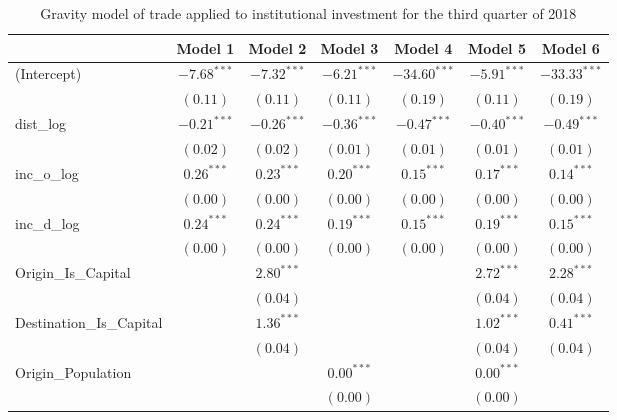 \begin{table}
	\begin{center}
		\caption[CGravity Model of Trade for Q3 2018]{Gravity model of trade applied to institutional investment for the third quarter of 2018}
		\begin{tabular}{l c c c c c c }
			\hline
			& Model 1 & Model 2 & Model 3 & Model 4 & Model 5 & Model 6 \\
			\hline
			(Intercept)                  & $-7.68^{***}$ & $-7.32^{***}$ & $-6.21^{***}$ & $-34.60^{***}$ & $-5.91^{***}$ & $-33.33^{***}$ \\
			& $(0.11)$      & $(0.11)$      & $(0.11)$      & $(0.19)$       & $(0.11)$      & $(0.19)$       \\
			dist\_log                    & $-0.21^{***}$ & $-0.26^{***}$ & $-0.36^{***}$ & $-0.47^{***}$  & $-0.40^{***}$ & $-0.49^{***}$  \\
			& $(0.02)$      & $(0.02)$      & $(0.01)$      & $(0.01)$       & $(0.01)$      & $(0.01)$       \\
			inc\_o\_log                  & $0.26^{***}$  & $0.23^{***}$  & $0.20^{***}$  & $0.15^{***}$   & $0.17^{***}$  & $0.14^{***}$   \\
			& $(0.00)$      & $(0.00)$      & $(0.00)$      & $(0.00)$       & $(0.00)$      & $(0.00)$       \\
			inc\_d\_log                  & $0.24^{***}$  & $0.24^{***}$  & $0.19^{***}$  & $0.15^{***}$   & $0.19^{***}$  & $0.15^{***}$   \\
			& $(0.00)$      & $(0.00)$      & $(0.00)$      & $(0.00)$       & $(0.00)$      & $(0.00)$       \\
			Origin\_Is\_Capital          &               & $2.80^{***}$  &               &                & $2.72^{***}$  & $2.28^{***}$   \\
			&               & $(0.04)$      &               &                & $(0.04)$      & $(0.04)$       \\
			Destination\_Is\_Capital     &               & $1.36^{***}$  &               &                & $1.02^{***}$  & $0.41^{***}$   \\
			&               & $(0.04)$      &               &                & $(0.04)$      & $(0.04)$       \\
			Origin\_Population           &               &               & $0.00^{***}$  &                & $0.00^{***}$  &                \\
			&               &               & $(0.00)$      &                & $(0.00)$      &                \\

\end{tabular}
\end{center}
\end{table}

